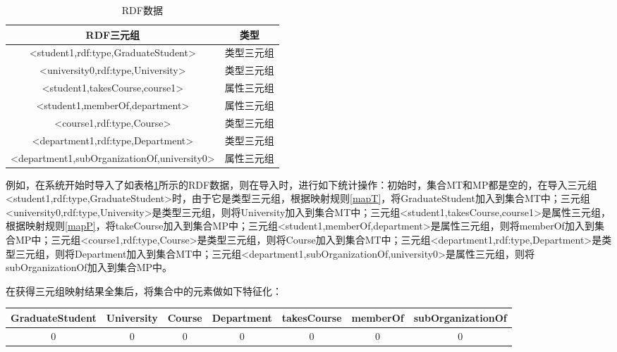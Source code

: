 \begin{table}[htbp]
    \caption[table1]{RDF数据}
    \label{RDF2}
    \vspace{0.5em}\centering\wuhao
    \begin{tabular}{|c|c|}
    \toprule[1.5pt]
    RDF三元组& 类型\\
    \midrule[1pt]    
    <student1,rdf:type,GraduateStudent>&类型三元组\\
    <university0,rdf:type,University>&类型三元组\\
    <student1,takesCourse,course1>&属性三元组\\
    <student1,memberOf,department>&属性三元组\\
    <course1,rdf:type,Course>&类型三元组\\
    <department1,rdf:type,Department>&类型三元组\\
    <department1,subOrganizationOf,university0>&属性三元组\\
    \bottomrule[1.5pt]
    \end{tabular}
\end{table}

例如，在系统开始时导入了如表格\ref{RDF2}所示的RDF数据，则在导入时，进行如下统计操作：初始时，集合MT和MP都是空的，在导入三元组<student1,rdf:type,GraduateStudent>时，由于它是类型三元组，根据映射规则\ref{mapT}，将GraduateStudent加入到集合MT中；三元组<university0,rdf:type,University>是类型三元组，则将University加入到集合MT中；三元组<student1,takesCourse,course1>是属性三元组，根据映射规则\ref{mapP}，将takeCourse加入到集合MP中；三元组<student1,memberOf,department>是属性三元组，则将memberOf加入到集合MP中；三元组<course1,rdf:type,Course>是类型三元组，则将Course加入到集合MT中；三元组<department1,rdf:type,Department>是类型三元组，则将Department加入到集合MT中；三元组<department1,subOrganizationOf,university0>是属性三元组，则将subOrganizationOf加入到集合MP中。

在获得三元组映射结果全集后，将集合中的元素做如下特征化：
\begin{table}[htbp]    
    \vspace{0.5em}\centering\wuhao
    \begin{tabular}{ccccccc}
    \toprule[1.5pt]
    GraduateStudent& University&Course&Department&takesCourse&memberOf&subOrganizationOf\\
    \midrule[1pt]    
    0&0&0&0&0&0&0\\
    \bottomrule[1.5pt]
    \end{tabular}
\end{table}

